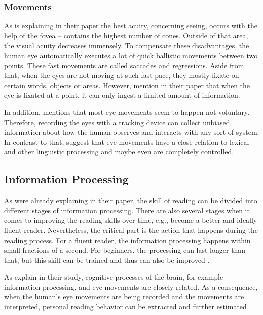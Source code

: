 \subsubsection{Movements}
As \textcite{djamasbi2014eye} is explaining in their paper the best acuity, concerning seeing, occurs with the help of the fovea -- contains the highest number of cones. Outside of that area, the visual acuity decreases immensely. To compensate these disadvantages, the human eye automatically executes a lot of quick ballistic movements between two points. These fast movements are called saccades and regressions.
Aside from that, when the eyes are not moving at such fast pace, they mostly fixate on certain words, objects or areas. However, \textcite{biedert2010eyebook} mention in their paper that when the eye is fixated at a point, it can only ingest a limited amount of information.

In addition, \textcite{bruneau2002eyes} mentions that most eye movements seem to happen not voluntary. Therefore, recording the eyes with a tracking device can collect unbiased information about how the human observes and interacts with any sort of system. In contrast to that, \textcite{clifton2016eye} suggest that eye movements have a close relation to lexical and other linguistic processing and maybe even are completely controlled.

\subsection{Information Processing}
\label{subsection:InformationProcessing}

As \textcite{laberge1974toward} were already explaining in their paper, the skill of reading can be divided into different stages of information processing. There are also several stages when it comes to improving the reading skills over time, e.g., become a better and ideally fluent reader. Nevertheless, the critical part is the action that happens during the reading process. For a fluent reader, the information processing happens within small fractions of a second. For beginners, the processing can last longer than that, but this skill can be trained and thus can also be improved \autocite{laberge1974toward}.

As \textcite{biedert2010eyebook} explain in their study, cognitive processes of the brain, for example information processing, and eye movements are closely related.  As a consequence, when the human's eye movements are being recorded and the movements are interpreted, personal reading behavior can be extracted and further estimated \autocite{biedert2010eyebook}.

